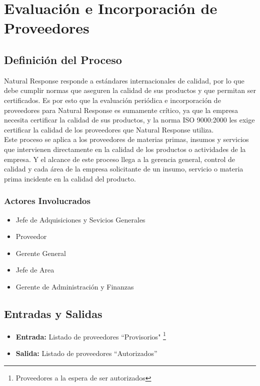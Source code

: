 \documentclass[12pt,letterpaper]{article}
\begin{document}
\section{Evaluación e Incorporación de Proveedores}

\subsection{Definición del Proceso}
Natural Response responde a estándares internacionales de calidad, por lo que debe cumplir normas que aseguren la calidad de sus productos y que permitan ser certificados. Es por esto que la evaluación periódica e incorporación de proveedores para Natural Response es sumamente crítico, ya que la empresa necesita certificar la calidad de sus productos, y la norma ISO 9000:2000 les exige certificar la calidad de los proveedores que Natural Response utiliza.\\

Este proceso se aplica a los proveedores de materias primas, insumos y servicios que intervienen directamente en la calidad de los productos o actividades de la empresa. Y el alcance de este proceso llega a la gerencia general, control de calidad y cada área de la empresa solicitante de un insumo, servicio o materia prima incidente en la calidad del producto.

\subsubsection{Actores Involucrados}
\begin{itemize}
\item{Jefe de Adquisiciones y Sevicios Generales}
\item{Proveedor}
\item{Gerente General}
\item{Jefe de Area}
\item{Gerente de Administración y Finanzas}
\end{itemize}

\subsection{Entradas y Salidas}
\begin{itemize}
\item{\textbf{Entrada:} Listado de proveedores ``Provisorios" \footnote{Proveedores a la espera de ser autorizados}}
\item{\textbf{Salida:} Listado de proveedores ``Autorizados'' }
\end{itemize}
\end{document}

